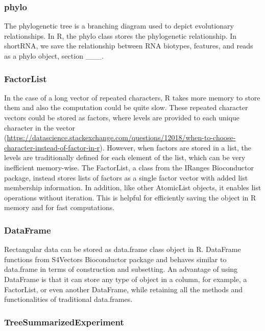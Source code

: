 \documentclass[12pt,twoside]{reedthesis}
\begin{document}
\hypertarget{phylo}{%
\subsubsection{phylo}\label{phylo}}

The phylogenetic tree is a branching diagram used to depict evolutionary
relationships. In R, the phylo class stores the phylogenetic
relationship. In shortRNA, we save the relationship between RNA
biotypes, features, and reads as a phylo object, section \_\_\_.

\hypertarget{factorlist}{%
\subsubsection{FactorList}\label{factorlist}}

In the case of a long vector of repeated characters, R takes more memory
to store them and also the computation could be quite slow. These
repeated character vectors could be stored as factors, where levels are
provided to each unique character in the vector
(\url{https://datascience.stackexchange.com/questions/12018/when-to-choose-character-instead-of-factor-in-r}).
However, when factors are stored in a list, the levels are traditionally
defined for each element of the list, which can be very inefficient
memory-wise. The FactorList, a class from the IRanges Bioconductor
package, instead stores lists of factors as a single factor vector with
added list membership information. In addition, like other AtomicList
objects, it enables list operations without iteration. This is helpful
for efficiently saving the object in R memory and for fast computations.

\hypertarget{dataframe}{%
\subsubsection{DataFrame}\label{dataframe}}

Rectangular data can be stored as data.frame class object in R.
DataFrame functions from S4Vectors Bioconductor package and behaves
similar to data.frame in terms of construction and subsetting. An
advantage of using DataFrame is that it can store any type of object in
a column, for example, a FactorList, or even another DataFrame, while
retaining all the methods and functionalities of traditional
data.frames.

\hypertarget{treesummarizedexperiment}{%
\subsubsection{TreeSummarizedExperiment}\label{treesummarizedexperiment}}
\end{document}
